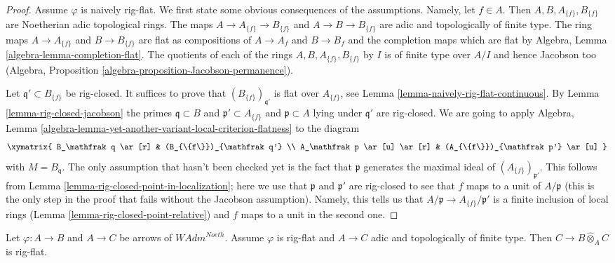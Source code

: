 \begin{proof}
Assume $\varphi$ is naively rig-flat. We first state some obvious
consequences of the assumptions. Namely, let $f \in A$.
Then $A, B, A_{\{f\}}, B_{\{f\}}$
are Noetherian adic topological rings. The maps
$A \to A_{\{f\}} \to B_{\{f\}}$ and $A \to B \to B_{\{f\}}$
are adic and topologically of finite type.
The ring maps $A \to A_{\{f\}}$ and $B \to B_{\{f\}}$
are flat as compositions of $A \to A_f$ and $B \to B_f$
and the completion maps which are flat by
Algebra, Lemma \ref{algebra-lemma-completion-flat}.
The quotients of each of the rings
$A, B, A_{\{f\}}, B_{\{f\}}$ by $I$ is of finite type
over $A/I$ and hence Jacobson too
(Algebra, Proposition \ref{algebra-proposition-Jacobson-permanence}).

\medskip\noindent
Let $\mathfrak q' \subset B_{\{f\}}$ be rig-closed.
It suffices to prove that $(B_{\{f\}})_{\mathfrak q'}$
is flat over $A_{\{f\}}$, see Lemma \ref{lemma-naively-rig-flat-continuous}.
By Lemma \ref{lemma-rig-closed-jacobson} the primes
$\mathfrak q \subset B$ and $\mathfrak p' \subset A_{\{f\}}$
and $\mathfrak p \subset A$ lying under $\mathfrak q'$ are rig-closed.
We are going to apply
Algebra, Lemma \ref{algebra-lemma-yet-another-variant-local-criterion-flatness}
to the diagram
$$
\xymatrix{
B_\mathfrak q \ar[r] &
(B_{\{f\}})_{\mathfrak q'} \\
A_\mathfrak p \ar[u] \ar[r] &
(A_{\{f\}})_{\mathfrak p'} \ar[u]
}
$$
with $M = B_\mathfrak q$.
The only assumption that hasn't been checked yet is the fact
that $\mathfrak p$ generates the maximal ideal of
$(A_{\{f\}})_{\mathfrak p'}$. This follows from
Lemma \ref{lemma-rig-closed-point-in-localization};
here we use that $\mathfrak p$ and $\mathfrak p'$ are rig-closed
to see that $f$ maps to a unit of $A/\mathfrak p$
(this is the only step in the proof that fails without
the Jacobson assumption). Namely,
this tells us that $A/\mathfrak p \to A_{\{f\}}/\mathfrak p'$
is a finite inclusion of local rings
(Lemma \ref{lemma-rig-closed-point-relative})
and $f$ maps to a unit in the second one.
\end{proof}

\begin{lemma}
\label{lemma-rig-flat-base-change}
Let $\varphi : A \to B$ and $A \to C$ be arrows of $\textit{WAdm}^{Noeth}$.
Assume $\varphi$ is rig-flat and $A \to C$ adic and topologically
of finite type. Then $C \to B \widehat{\otimes}_A C$ is rig-flat.
\end{lemma}

